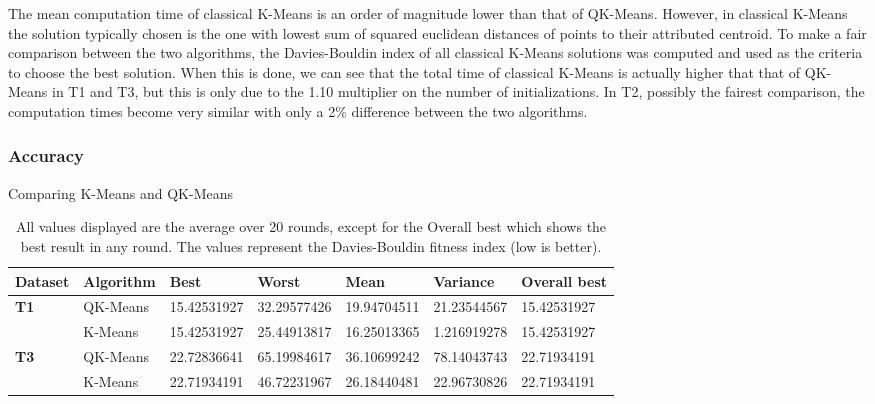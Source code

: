 The mean computation time of classical K-Means is an order of magnitude lower than that of QK-Means. However, in classical K-Means the solution typically chosen is the one with lowest sum of squared euclidean distances of points to their attributed centroid. To make a fair comparison between the two algorithms, the Davies-Bouldin index of all classical K-Means solutions was computed and used as the criteria to choose the best solution. When this is done, we can see that the total time of classical K-Means is actually higher that that of QK-Means in T1 and T3, but this is only due to the 1.10 multiplier on the number of initializations. In T2, possibly the fairest comparison, the computation times become very similar with only a 2\% difference between the two algorithms.

\subsubsection{Accuracy}

Comparing K-Means and QK-Means


\begin{table}[h]
\centering
\caption{All values displayed are the average over 20 rounds, except for the Overall best which shows the best result in any round. The values represent the Davies-Bouldin fitness index (low is better).}
\begin{tabular}{lllllll}

\toprule

\textbf{Dataset} & \textbf{Algorithm} & \textbf{Best} & \textbf{Worst} & \textbf{Mean} & \textbf{Variance} & \textbf{Overall best} \\
\midrule
\textbf{T1}      & QK-Means           & 15.42531927   & 32.29577426    & 19.94704511   & 21.23544567       & 15.42531927           \\
\textbf{}        & K-Means            & 15.42531927   & 25.44913817    & 16.25013365   & 1.216919278       & 15.42531927           \\
\midrule
\textbf{T3}      & QK-Means           & 22.72836641   & 65.19984617    & 36.10699242   & 78.14043743       & 22.71934191           \\
\textbf{}        & K-Means            & 22.71934191   & 46.72231967    & 26.18440481   & 22.96730826       & 22.71934191           \\
\bottomrule
\end{tabular}
\end{table}

